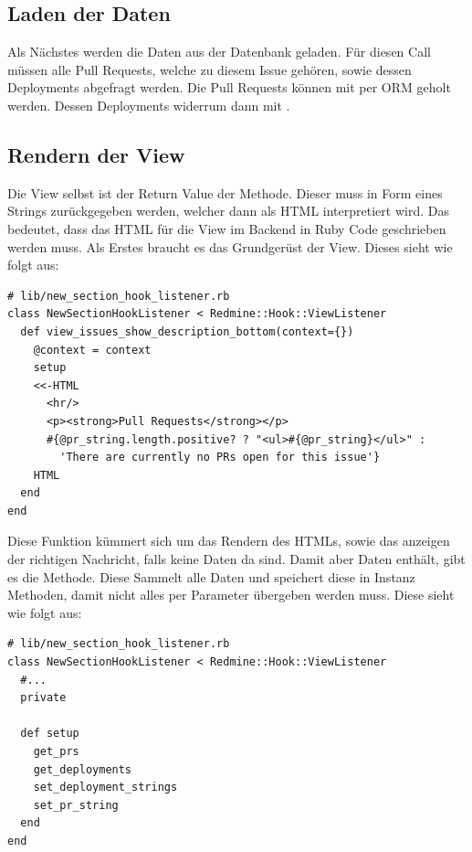\subsection{Laden der Daten}
Als Nächstes werden die Daten aus der Datenbank geladen. Für diesen Call müssen alle Pull Requests, welche
zu diesem Issue gehören, sowie dessen Deployments abgefragt werden. \newline
Die Pull Requests können mit 
per ORM geholt werden. Dessen Deployments widerrum dann mit
. \newline
\subsection{Rendern der View}
Die View selbst ist der Return Value der  Methode. Dieser
muss in Form eines Strings zurückgegeben werden, welcher dann als HTML interpretiert wird. \newline
Das bedeutet, dass das HTML für die View im Backend in Ruby Code geschrieben werden muss. Als Erstes braucht es das
Grundgerüst der View. Dieses sieht wie folgt aus:
\begin{codebox}[]
  \begin{verbatim}
# lib/new_section_hook_listener.rb
class NewSectionHookListener < Redmine::Hook::ViewListener
  def view_issues_show_description_bottom(context={})
    @context = context
    setup
    <<-HTML
      <hr/>
      <p><strong>Pull Requests</strong></p>
      #{@pr_string.length.positive? ? "<ul>#{@pr_string}</ul>" :
        'There are currently no PRs open for this issue'}
    HTML
  end
end
  \end{verbatim}
\end{codebox}
Diese Funktion kümmert sich um das Rendern des HTMLs, sowie das anzeigen der richtigen Nachricht, falls keine Daten
da sind. Damit aber  Daten enthält, gibt es die  Methode.
Diese Sammelt alle Daten und speichert diese in Instanz Methoden, damit nicht alles per Parameter übergeben werden
muss. Diese sieht wie folgt aus:
\begin{codebox}[]
  \begin{verbatim}
# lib/new_section_hook_listener.rb
class NewSectionHookListener < Redmine::Hook::ViewListener
  #...
  private

  def setup
    get_prs
    get_deployments
    set_deployment_strings
    set_pr_string
  end
end
  \end{verbatim}
\end{codebox}
